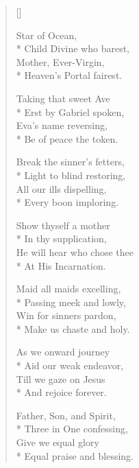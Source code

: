 \newHymn



\settowidth{\versewidth}{Of the Lord most high.}
\begin{multicols}{2}
\begin{verse}[\versewidth]

 Star of Ocean,\\*
Child Divine who barest,\\
Mother, Ever-Virgin,\\*
Heaven's Portal fairest.

Taking that sweet Ave\\*
Erst by Gabriel spoken,\\
Eva's name reversing,\\*
Be of peace the token.

Break the sinner's fetters,\\*
Light to blind restoring,\\
All our ills dispelling,\\*
Every boon imploring.

Show thyself a mother\\*
In thy supplication,\\
He will hear who chose thee\\*
At His Incarnation.

Maid all maids excelling,\\*
Passing meek and lowly,\\
Win for sinners pardon,\\*
Make us chaste and holy.

As we onward journey\\*
Aid our weak endeavor,\\
Till we gaze on Jesus\\*
And rejoice forever.

Father, Son, and Spirit,\\*
Three in One confessing,\\
Give we equal glory\\*
Equal praise and blessing.
\end{verse}
\end{multicols}



